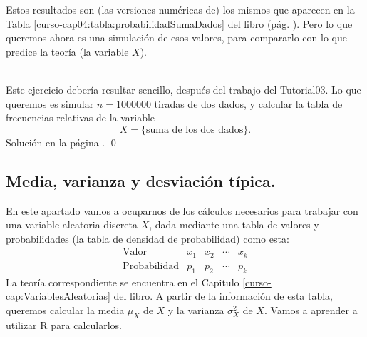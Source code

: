 \documentclass[10pt,a4paper]{article}\usepackage[]{graphicx}\usepackage[]{color}
\begin{document}
Estos resultados son (las versiones numéricas de) los mismos que aparecen en la Tabla \ref{curso-cap04:tabla:probabilidadSumaDados} del libro (pág. \pageref{curso-cap04:tabla:probabilidadSumaDados}). Pero lo que queremos ahora es una simulación de esos valores, para compararlo con lo que predice la teoría (la variable $X$).

\begin{ejercicio}
\label{tut04:ejercicio01}
\quad\\
Este ejercicio debería resultar sencillo, después del trabajo del Tutorial03. Lo que queremos es simular $n=1000000$ tiradas de dos dados, y calcular la tabla de frecuencias relativas de la variable \[X=\{\mbox{suma de los dos dados}\}.\]
Solución en la página \pageref{tut04:ejercicio01:sol}.
\qed
\end{ejercicio}

%

\subsection{Media, varianza y desviación típica.}
\label{tut04:subsec:MediaVarianzaDesviacionTipica}

En este apartado vamos a ocuparnos de los cálculos necesarios para trabajar con una
variable aleatoria discreta $X$, dada mediante una tabla de valores y probabilidades (la tabla de densidad de probabilidad) como esta:
\[
\begin{array}{c|c|c|c|c|}
    \mbox{Valor}&x_1&x_2&\cdots&x_k \\
    \hline
    \mbox{Probabilidad}&p_1&p_2&\cdots&p_k
\end{array}
\]
La teoría correspondiente se encuentra en  el Capitulo \ref{curso-cap:VariablesAleatorias} del libro. A partir de la información de esta tabla, queremos calcular la media $\mu_X$ de $X$ y la varianza $\sigma^2_X$ de $X$. Vamos a aprender a utilizar R para calcularlos.
\end{document}
